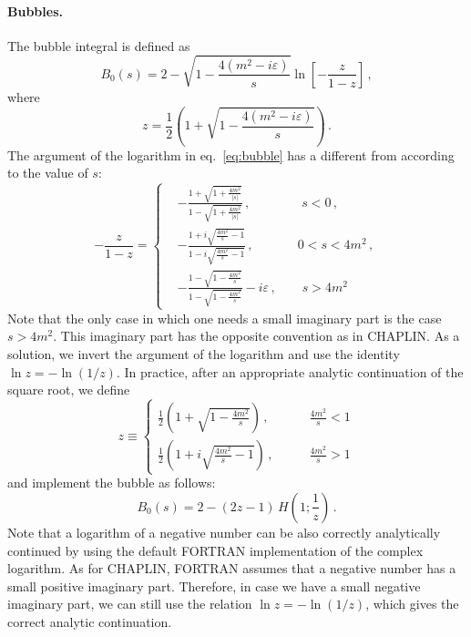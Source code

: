 \documentclass[12pt]{article}
\begin{document}
\paragraph{Bubbles.} The bubble integral is defined as
\begin{equation}
  \label{eq:bubble}
  B_0(s)=2 -\sqrt{1-\frac{4(m^2-i\varepsilon)}{s}}\ln\left[-\frac{z}{1-z}\right]\,,
\end{equation}
where 
\begin{equation}
  \label{eq:z}
  z=\frac{1}{2}\left(1+\sqrt{1-\frac{4(m^2-i\varepsilon)}{s}}\right)\,.
\end{equation}
The argument of the logarithm in eq.~\eqref{eq:bubble} has a different
from according to the value of $s$:
\begin{equation}
  \label{eq:z-omz}
  -\frac{z}{1-z} = \left\{
    \begin{split}
      &-\frac{1+\sqrt{1+\frac{4m^2}{|s|}}}{1-\sqrt{1+\frac{4m^2}{|s|}}}\,,\qquad \qquad s<0\,,\\
        & -\frac{1+i\sqrt{\frac{4m^2}{s}-1}}{1-i\sqrt{\frac{4m^2}{s}-1}}\,,\qquad \quad\>\> 0<s<4m^2\,,\\
        &
        -\frac{1-\sqrt{1-\frac{4m^2}{s}}}{1-\sqrt{1-\frac{4m^2}{s}}}-i\varepsilon\,,\qquad
        s>4m^2
    \end{split}
\right.
\end{equation}
Note that the only case in which one needs a small imaginary part is
the case $s>4m^2$. This imaginary part has the opposite convention as
in CHAPLIN. As a solution, we invert the argument of the logarithm and
use the identity $\ln z = -\ln(1/z)$. In practice, after an appropriate analytic
continuation of the square root, we define
\begin{equation}
  \label{eq:z-implemented}
  z \equiv \left\{\begin{split}
      \frac{1}{2}\left(1+\sqrt{1-\frac{4m^2}{s}}\right)\,,& \qquad \frac{4m^2}{s}<1\\
      \frac{1}{2}\left(1+i\sqrt{\frac{4m^2}{s}-1}\right)\,,& \qquad \frac{4m^2}{s}>1
    \end{split}
    \right.
  \end{equation}
and implement the bubble as follows:
\begin{equation}
  \label{eq:bubble-implemented}
  B_0(s)=
      2 -(2 z-1) \,H\left(1;\frac{1}{z}\right) \,.
\end{equation}
Note that a logarithm of a negative number can be also correctly
analytically continued by using the default FORTRAN implementation
of the complex logarithm. As for CHAPLIN, FORTRAN assumes that a
negative number has a small positive imaginary part. Therefore, in
case we have a small negative imaginary part, we can still use the
relation $\ln z = -\ln(1/z)$, which gives the correct analytic continuation.
\end{document}
